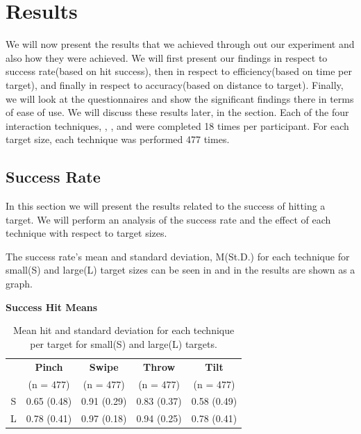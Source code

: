 \section{Results}
We will now present the results that we achieved through out our experiment and also how they were achieved. We will first present our findings in respect to success rate(based on hit success), then in respect to efficiency(based on time per target), and finally in respect to accuracy(based on distance to target). Finally, we will look at the questionnaires and show the significant findings there in terms of ease of use. We will discuss these results later, in the  section.  
Each of the four interaction techniques, \pinch, \swipe, \throw and \tilt were completed 18 times per participant. 
For each target size, each technique was performed 477 times. 

\subsection{Success Rate}
In this section we will present the results related to the success of hitting a target.
We will perform an analysis of the success rate and the effect of each technique with respect to target sizes.

The success rate's mean and standard deviation, M(St.D.) for each technique for small(S) and large(L) target sizes can be seen in  and in  the results are shown as a graph.

\begin{table}[H]
	\centering
	\textbf{Success Hit Means}\\[4pt]
	\begin{adjustbox}{width=\columnwidth}
	\begin{tabular}{|c|c|c|c|c|}
			\hline
			\rowcolor[HTML]{9B9B9B} 
			& \textbf{Pinch} & \textbf{Swipe} & \textbf{Throw} & \textbf{Tilt} \\
			\rowcolor[HTML]{9B9B9B} 
			 & (n = 477) & (n = 477) & (n = 477) & (n = 477) \\ \hline
			S & 0.65 (0.48)       & 0.91 (0.29)         & 0.83 (0.37)         & 0.58 (0.49)        \\ \hline
			L & 0.78 (0.41)        & 0.97 (0.18)         & 0.94 (0.25)        & 0.78 (0.41)       \\ \hline
	\end{tabular}
	\end{adjustbox}
	\caption{Mean hit  and standard deviation for each technique per target for small(S) and large(L) targets.}
	\label{tab:meanHitTechnique}
\end{table}

